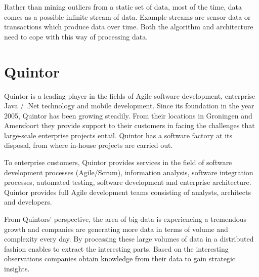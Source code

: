 Rather than mining outliers from a static set of data, most of the time, data comes as a possible infinite stream of data. Example streams are sensor data or transactions which produce data over time. Both the algorithm and architecture need to cope with this way of processing data.

\section{Quintor \label{sec1-Quintor}}
Quintor is a leading player in the fields of Agile software development, enterprise Java / .Net technology and mobile development. Since its foundation in the year 2005, Quintor has been growing steadily. From their locations in Groningen and Amersfoort they provide support to their customers in facing the challenges that large-scale enterprise projects entail. Quintor has a software factory at its disposal, from where in-house projects are carried out. 

To enterprise customers, Quintor provides services in the field of software development processes (Agile/Scrum), information analysis, software integration processes, automated testing, software development and enterprise architecture. Quintor provides full Agile development teams consisting of analysts, architects and developers.

From Quintors' perspective, the area of big-data is experiencing a tremendous growth and companies are generating more data in terms of volume and complexity every day. By processing these large volumes of data in a distributed fashion enables to extract the interesting parts. Based on the interesting observations companies obtain knowledge from their data to gain strategic insights.
